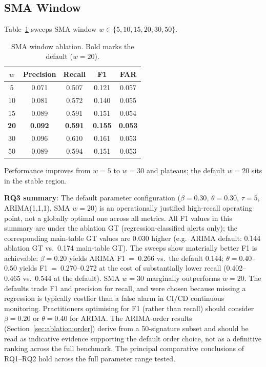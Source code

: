 \documentclass[a4paper,fleqn]{cas-sc}
\theoremstyle{plain}
\begin{document}
\subsection{SMA Window}\label{sec:ablation:sma}

Table~\ref{tab:ablation_sma} sweeps SMA window $w \in \{5, 10, 15, 20, 30, 50\}$.

\begin{table}[tbp]
\centering
\begin{tabular}{ccccc}
\toprule
$w$ & Precision & Recall & F1 & FAR \\
\midrule
5  & 0.071 & 0.507 & 0.121 & 0.057 \\
10 & 0.081 & 0.572 & 0.140 & 0.055 \\
15 & 0.089 & 0.591 & 0.151 & 0.054 \\
\textbf{20} & \textbf{0.092} & \textbf{0.591} & \textbf{0.155} & \textbf{0.053} \\
30 & 0.096 & 0.610 & 0.161 & 0.053 \\
50 & 0.089 & 0.594 & 0.151 & 0.053 \\
\bottomrule
\end{tabular}
\caption{SMA window ablation. Bold marks the default ($w = 20$).}
\label{tab:ablation_sma}
\end{table}

Performance improves from $w=5$ to $w=30$ and plateaus; the default $w=20$
sits in the stable region.

\textbf{RQ3 summary}: The default parameter configuration ($\beta=0.30$,
$\theta=0.30$, $\tau=5$, ARIMA(1,1,1), SMA $w=20$) is an operationally
justified high-recall operating point, not a globally optimal one across
all metrics.
All F1 values in this summary are under the ablation GT
(regression-classified alerts only); the corresponding main-table GT values
are 0.030 higher (e.g.\ ARIMA default: 0.144 ablation GT vs.\ 0.174 main-table GT).
The sweeps show materially better F1 is achievable: $\beta=0.20$ yields
ARIMA F1~=~0.266 vs.\ the default 0.144; $\theta=0.40$--$0.50$ yields
F1~=~0.270--0.272 at the cost of substantially lower recall (0.402--0.465
vs.\ 0.544 at the default).
SMA $w=30$ marginally outperforms $w=20$.
The defaults trade F1 and precision for recall, and were chosen because
missing a regression is typically costlier than a false alarm in CI/CD
continuous monitoring.
Practitioners optimising for F1 (rather than recall) should consider
$\beta=0.20$ or $\theta=0.40$ for ARIMA.
The ARIMA-order results (Section~\ref{sec:ablation:order}) derive from a
50-signature subset and should be read as indicative evidence supporting
the default order choice, not as a definitive ranking across the full benchmark.
The principal comparative conclusions of RQ1--RQ2 hold across the full
parameter range tested.
\end{document}
